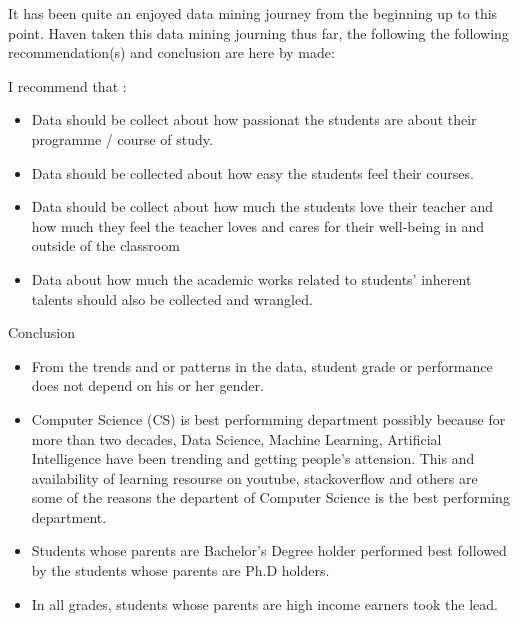 It has been quite an enjoyed data mining journey from the beginning up to this point. Haven taken this data mining journing thus far, the following the following recommendation(s) and conclusion are here by made:
\begin{description}
	\item[Recommendation] I recommend that :  
	\begin{itemize}
		\item Data should be collect about how passionat the students are about their programme / course of study.
		
		\item Data should be collected about how easy the students feel their courses.
		
		\item Data should be collect about how much the students love their teacher and how much they feel the teacher loves and cares for their well-being in and outside of the classroom
		
		\item Data about how much the academic works related to students' inherent talents should also be collected and wrangled.
	\end{itemize}

	\item Conclusion
	\begin{itemize}
		\item From the trends and or patterns in the data, student grade or performance does not depend on his or her gender.
		
		\item Computer Science (CS) is best performming department possibly because for more than two decades, Data Science, Machine Learning, Artificial Intelligence have been trending and getting people's attension. This and availability of learning resourse on youtube, stackoverflow and others are some of the reasons the departent of Computer Science is the best performing department.
		
		\item Students whose parents are Bachelor's Degree holder performed best followed by the students whose parents are Ph.D holders.
		
		\item In all grades, students whose parents are high  income earners took the lead.
	\end{itemize}
\end{description}